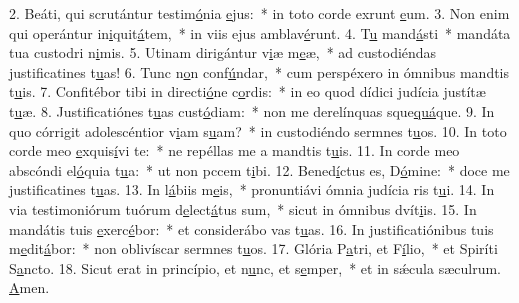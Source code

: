 2. Beáti, qui scrutántur testim\uline{ó}nia \uline{e}jus:~* in toto corde exrunt \uline{e}um.
3. Non enim qui operántur in\uline{i}quit\uline{á}tem,~* in viis ejus amblav\uline{é}runt.
4. T\uline{u} mand\uline{á}sti~* mandáta tua custodri n\uline{i}mis.
5. Utinam dirigántur v\uline{i}æ m\uline{e}æ,~* ad custodiéndas justificatines t\uline{u}as!
6. Tunc n\uline{o}n conf\uline{ú}ndar,~* cum perspéxero in ómnibus mandtis t\uline{u}is.
7. Confitébor tibi in directi\uline{ó}ne c\uline{o}rdis:~* in eo quod dídici judícia justítæ t\uline{u}æ.
8. Justificatiónes t\uline{u}as cust\uline{ó}diam:~* non me derelínquas sque\uline{quá}que.
9. In quo córrigit adolescéntior v\uline{i}am s\uline{u}am?~* in custodiéndo sermnes t\uline{u}os.
10. In toto corde meo \uline{e}xquis\uline{í}vi te:~* ne repéllas me a mandtis t\uline{u}is.
11. In corde meo abscóndi el\uline{ó}quia t\uline{u}a:~* ut non pccem t\uline{i}bi.
12. Bened\uline{í}ctus es, D\uline{ó}mine:~* doce me justificatines t\uline{u}as.
13. In l\uline{á}biis m\uline{e}is,~* pronuntiávi ómnia judícia ris t\uline{u}i.
14. In via testimoniórum tuórum d\uline{e}lect\uline{á}tus sum,~* sicut in ómnibus dvít\uline{i}is.
15. In mandátis tuis \uline{e}xerc\uline{é}bor:~* et considerábo vas t\uline{u}as.
16. In justificatiónibus tuis m\uline{e}dit\uline{á}bor:~* non oblivíscar sermnes t\uline{u}os.
17. Glória P\uline{a}tri, et F\uline{í}lio,~* et Spiríti S\uline{a}ncto.
18. Sicut erat in princípio, et n\uline{u}nc, et s\uline{e}mper,~* et in sǽcula sæculrum. \uline{A}men.
